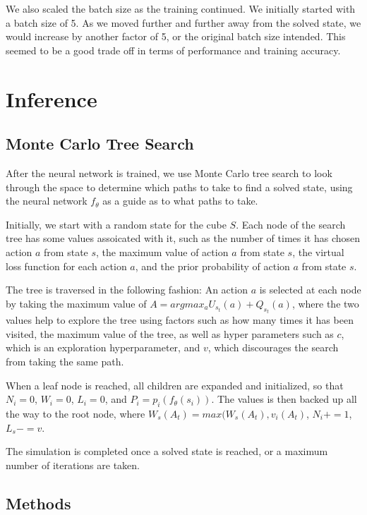 \documentclass[10pt,twocolumn,letterpaper]{article}
\begin{document}
We also scaled the batch size as the training continued. We initially started with a batch size of 5. As we moved further and further away from the solved state, we would increase by another factor of 5, or the original batch size intended. This seemed to be a good trade off in terms of performance and training accuracy.


\section{Inference}

\subsection{Monte Carlo Tree Search}

After the neural network is trained, we use Monte Carlo tree search to look through the space to determine which paths to take to find a solved state, using the neural network $f_\theta$ as a guide as to what paths to take. 

Initially, we start with a random state for the cube $S$. Each node of the search tree has some values assoicated with it, such as the number of times it has chosen action $a$ from state $s$, the maximum value of action $a$ from state $s$, the virtual loss function for each action $a$, and the prior probability of action $a$ from state $s$.

The tree is traversed in the following fashion: An action $a$ is selected at each node by taking the maximum value of $A=argmax_a U_{s_{t}}(a) + Q_{s_{t}}(a) $, where the two values help to explore the tree using factors such as how many times it has been visited, the maximum value of the tree, as well as hyper parameters such as $c$, which is an exploration hyperparameter, and $v$, which discourages the search from taking the same path.

When a leaf node is reached, all children are expanded and initialized, so that $N_i = 0$, $W_i = 0$, $L_i = 0$, and $P_i = p_i(f_\theta (s_i))$. The values is  then backed up all the way to the root node, where $W_s(A_t) = max(W_s(A_t), v_i(A_t)$, $N_i += 1$, $L_s -= v$.

The simulation is completed once a solved state is reached, or a maximum number of iterations are taken.

\subsection{Methods}
\end{document}

